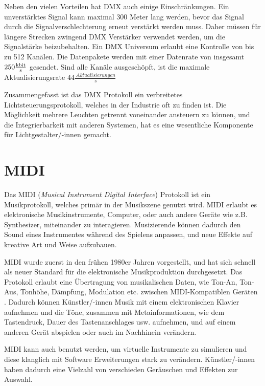 Neben den vielen Vorteilen hat DMX auch einige Einschränkungen. Ein unverstärktes Signal kann maximal 300 Meter lang werden, bevor das Signal durch die Signalverschlechterung erneut verstärkt werden muss. Daher müssen für längere Strecken zwingend DMX Verstärker verwendet werden, um die Signalstärke beizubehalten. Ein DMX Universum erlaubt eine Kontrolle von bis zu 512 Kanälen. Die Datenpakete werden mit einer Datenrate von insgesamt $250 \frac{\SI{}{\kilo\bit}}{\SI{}{\s}}$ gesendet. Sind alle Kanäle ausgeschöpft, ist die maximale Aktualisierungsrate $44 \frac{\SI{}{Aktualisierungen}}{\SI{}{\s}}$ \cite[S.18, table6]{DMX512-Protocol-Standard}

Zusammengefasst ist das DMX Protokoll ein verbreitetes Lichtsteuerungsprotokoll, welches in der Industrie oft zu finden ist. Die Möglichkeit mehrere Leuchten getrennt voneinander ansteuern zu können, und die Integrierbarkeit mit anderen Systemen, hat es eine wesentliche Komponente für Lichtgestalter/-innen gemacht.


\section{MIDI}

Das MIDI (\emph{Musical Instrument Digital Interface}) Protokoll ist ein Musikprotokoll, welches primär in der Musikszene genutzt wird. MIDI erlaubt es elektronische Musikinstrumente, Computer, oder auch andere Geräte wie z.B. Synthesizer, miteinander zu interagieren. Musizierende können dadurch den Sound eines Instrumentes während des Spielens anpassen, und neue Effekte auf kreative Art und Weise aufzubauen.

MIDI wurde zuerst in den frühen 1980er Jahren \cite[S.1]{MIDI-Complete-SPECIFICATION} vorgestellt, und hat sich schnell als neuer Standard für die elektronische Musikproduktion durchgesetzt. Das Protokoll erlaubt eine Übertragung von musikalischen Daten, wie Ton-An, Ton-Aus, Tonhöhe, Dämpfung, Modulation etc. zwischen MIDI-Kompatiblen Geräten \cite[S.9]{MIDI-DETAILED-SPECIFICATION}. Dadurch können Künstler/-innen Musik mit einem elektronischen Klavier aufnehmen und die Töne, zusammen mit Metainformationen, wie dem Tastendruck, Dauer des Tastenanschlages usw. aufnehmen, und auf einem anderen Gerät abspielen oder auch im Nachhinein verändern. 

MIDI kann auch benutzt werden, um virtuelle Instrumente zu simulieren und diese klanglich mit Software Erweiterungen stark zu verändern. Künstler/-innen haben dadurch eine Vielzahl von verschieden Geräuschen und Effekten zur Auswahl.

